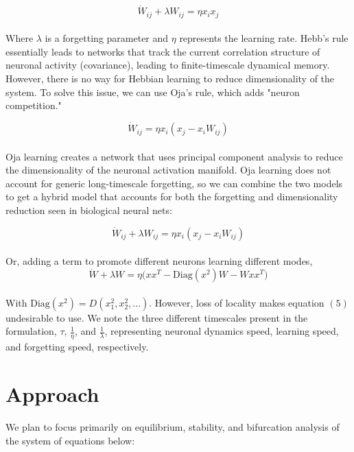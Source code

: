 \documentclass{article}
\begin{document}
\begin{equation}
    \dot{W}_{ij} +\lambda W_{ij} = \eta x_i x_j
\end{equation}
\\
Where $\lambda$ is a forgetting parameter and $\eta$ represents the learning rate. Hebb's rule essentially leads to networks that track the current correlation structure of neuronal activity (covariance), leading to finite-timescale dynamical memory. However, there is no way for Hebbian learning to reduce dimensionality of the system. To solve this issue, we can use Oja's rule, which adds "neuron competition."

\begin{equation}
    \dot{W}_{ij} = \eta x_i (x_j - x_iW_{ij})
\end{equation}
\\
Oja learning creates a network that uses principal component analysis to reduce the dimensionality of the neuronal activation manifold. Oja learning does not account for generic long-timescale forgetting, so we can combine the two models to get a hybrid model that accounts for both the forgetting and dimensionality reduction seen in biological neural nets:

\begin{equation}
    \dot{W}_{ij} +\lambda W_{ij} = \eta x_i (x_j - x_iW_{ij})
\end{equation}
\\
Or, adding a term to promote different neurons learning different modes,
\begin{equation}
    \dot{W} +\lambda W = \eta \bigg(x x^T - \text{Diag}(x^2)W - Wxx^T\bigg)
\end{equation}
\\
With $\text{Diag}(x^2) = D(x_1^2,x_2^2,...)$. However, loss of locality makes equation $(5)$ undesirable to use. We note the three different timescales present in the formulation, $\tau$, $\frac{1}{\eta}$, and $\frac{1}{\lambda}$, representing neuronal dynamics speed, learning speed, and forgetting speed, respectively.

\section*{Approach}
We plan to focus primarily on equilibrium, stability, and bifurcation analysis of the system of equations below:
\end{document}
